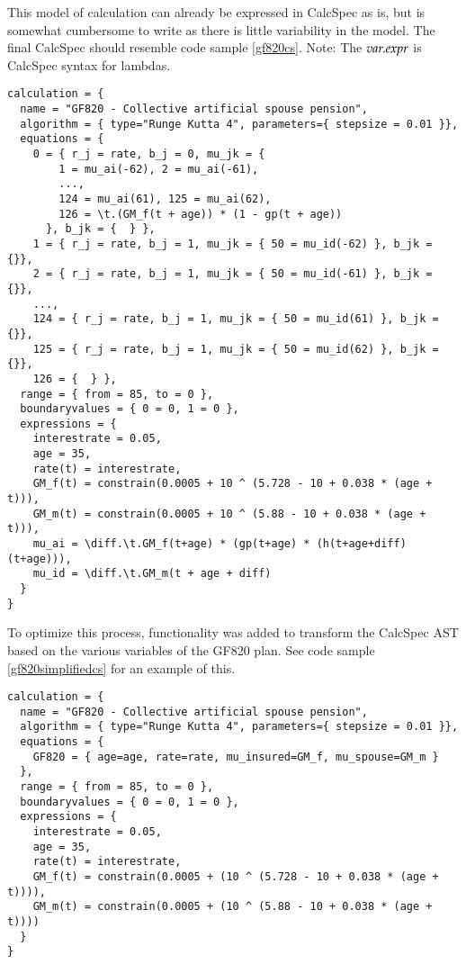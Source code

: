 This model of calculation can already be expressed in CalcSpec as is, but is somewhat cumbersome to write as there is little variability in the model.
The final CalcSpec should resemble code sample \ref{gf820cs}.
Note: The $\\var.expr$ is CalcSpec syntax for lambdas.

\begin{lstlisting}[language=calcspec, caption=GF820 CalcSpec, label=gf820cs]
calculation = {
  name = "GF820 - Collective artificial spouse pension", 
  algorithm = { type="Runge Kutta 4", parameters={ stepsize = 0.01 }}, 
  equations = { 
    0 = { r_j = rate, b_j = 0, mu_jk = { 
        1 = mu_ai(-62), 2 = mu_ai(-61), 
        ...,
        124 = mu_ai(61), 125 = mu_ai(62), 
        126 = \t.(GM_f(t + age)) * (1 - gp(t + age))
      }, b_jk = {  } }, 
    1 = { r_j = rate, b_j = 1, mu_jk = { 50 = mu_id(-62) }, b_jk = {}}, 
    2 = { r_j = rate, b_j = 1, mu_jk = { 50 = mu_id(-61) }, b_jk = {}}, 
    ...,
    124 = { r_j = rate, b_j = 1, mu_jk = { 50 = mu_id(61) }, b_jk = {}}, 
    125 = { r_j = rate, b_j = 1, mu_jk = { 50 = mu_id(62) }, b_jk = {}}, 
    126 = {  } }, 
  range = { from = 85, to = 0 }, 
  boundaryvalues = { 0 = 0, 1 = 0 }, 
  expressions = { 
    interestrate = 0.05, 
    age = 35, 
    rate(t) = interestrate, 
    GM_f(t) = constrain(0.0005 + 10 ^ (5.728 - 10 + 0.038 * (age + t))), 
    GM_m(t) = constrain(0.0005 + 10 ^ (5.88 - 10 + 0.038 * (age + t))), 
    mu_ai = \diff.\t.GM_f(t+age) * (gp(t+age) * (h(t+age+diff)(t+age))), 
    mu_id = \diff.\t.GM_m(t + age + diff) 
  }
}
\end{lstlisting}

To optimize this process, functionality was added to transform the CalcSpec AST based on the various variables of the GF820 plan.
See code sample \ref{gf820simplifiedcs} for an example of this.

\begin{lstlisting}[language=calcspec, caption=GF820 CalcSpec, label=gf820simplifiedcs]
calculation = { 
  name = "GF820 - Collective artificial spouse pension", 
  algorithm = { type="Runge Kutta 4", parameters={ stepsize = 0.01 }}, 
  equations = { 
    GF820 = { age=age, rate=rate, mu_insured=GM_f, mu_spouse=GM_m }
  }, 
  range = { from = 85, to = 0 }, 
  boundaryvalues = { 0 = 0, 1 = 0 }, 
  expressions = { 
    interestrate = 0.05,
    age = 35,
    rate(t) = interestrate,
    GM_f(t) = constrain(0.0005 + (10 ^ (5.728 - 10 + 0.038 * (age + t)))),
    GM_m(t) = constrain(0.0005 + (10 ^ (5.88 - 10 + 0.038 * (age + t))))
  }
}
\end{lstlisting}

